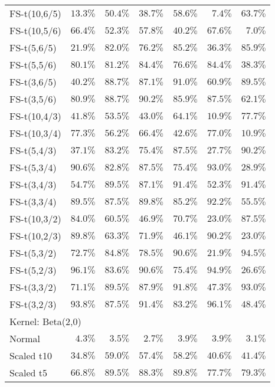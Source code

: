 \begin{longtable}{lrrrrrr}
FS-t(10,6/5) & $13.3\%$ & $50.4\%$ & $38.7\%$ & $58.6\%$ & $7.4\%$ & $63.7\%$ \\ 
FS-t(10,5/6) & $66.4\%$ & $52.3\%$ & $57.8\%$ & $40.2\%$ & $67.6\%$ & $7.0\%$ \\ 
FS-t(5,6/5) & $21.9\%$ & $82.0\%$ & $76.2\%$ & $85.2\%$ & $36.3\%$ & $85.9\%$ \\ 
FS-t(5,5/6) & $80.1\%$ & $81.2\%$ & $84.4\%$ & $76.6\%$ & $84.4\%$ & $38.3\%$ \\ 
FS-t(3,6/5) & $40.2\%$ & $88.7\%$ & $87.1\%$ & $91.0\%$ & $60.9\%$ & $89.5\%$ \\ 
FS-t(3,5/6) & $80.9\%$ & $88.7\%$ & $90.2\%$ & $85.9\%$ & $87.5\%$ & $62.1\%$ \\ 
FS-t(10,4/3) & $41.8\%$ & $53.5\%$ & $43.0\%$ & $64.1\%$ & $10.9\%$ & $77.7\%$ \\ 
FS-t(10,3/4) & $77.3\%$ & $56.2\%$ & $66.4\%$ & $42.6\%$ & $77.0\%$ & $10.9\%$ \\ 
FS-t(5,4/3) & $37.1\%$ & $83.2\%$ & $75.4\%$ & $87.5\%$ & $27.7\%$ & $90.2\%$ \\ 
FS-t(5,3/4) & $90.6\%$ & $82.8\%$ & $87.5\%$ & $75.4\%$ & $93.0\%$ & $28.9\%$ \\ 
FS-t(3,4/3) & $54.7\%$ & $89.5\%$ & $87.1\%$ & $91.4\%$ & $52.3\%$ & $91.4\%$ \\ 
FS-t(3,3/4) & $89.5\%$ & $87.5\%$ & $89.8\%$ & $85.2\%$ & $92.2\%$ & $55.5\%$ \\ 
FS-t(10,3/2) & $84.0\%$ & $60.5\%$ & $46.9\%$ & $70.7\%$ & $23.0\%$ & $87.5\%$ \\ 
FS-t(10,2/3) & $89.8\%$ & $63.3\%$ & $71.9\%$ & $46.1\%$ & $90.2\%$ & $23.0\%$ \\ 
FS-t(5,3/2) & $72.7\%$ & $84.8\%$ & $78.5\%$ & $90.6\%$ & $21.9\%$ & $94.5\%$ \\ 
FS-t(5,2/3) & $96.1\%$ & $83.6\%$ & $90.6\%$ & $75.4\%$ & $94.9\%$ & $26.6\%$ \\ 
FS-t(3,3/2) & $71.1\%$ & $89.5\%$ & $87.9\%$ & $91.8\%$ & $47.3\%$ & $93.0\%$ \\ 
FS-t(3,2/3) & $93.8\%$ & $87.5\%$ & $91.4\%$ & $83.2\%$ & $96.1\%$ & $48.4\%$ \\ 
\midrule
\multicolumn{7}{l}{Kernel: Beta(2,0)} \\ 
\midrule
Normal & $4.3\%$ & $3.5\%$ & $2.7\%$ & $3.9\%$ & $3.9\%$ & $3.1\%$ \\ 
Scaled t10 & $34.8\%$ & $59.0\%$ & $57.4\%$ & $58.2\%$ & $40.6\%$ & $41.4\%$ \\ 
Scaled t5 & $66.8\%$ & $89.5\%$ & $88.3\%$ & $89.8\%$ & $77.7\%$ & $79.3\%$ \\ 

\end{longtable}
